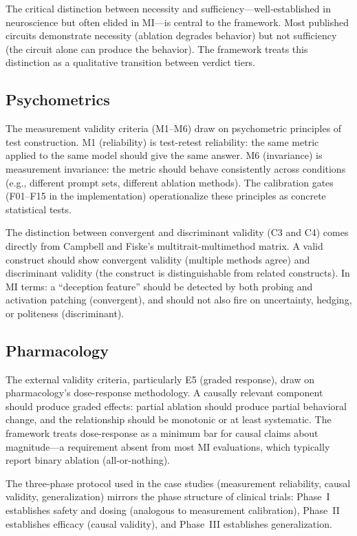 \documentclass[10pt]{article}
\newcommand{\eg}{e.g.}
\begin{document}
The critical distinction between necessity and sufficiency---well-established in neuroscience but often elided in MI---is central to the framework. Most published circuits demonstrate necessity (ablation degrades behavior) but not sufficiency (the circuit alone can produce the behavior). The framework treats this distinction as a qualitative transition between verdict tiers.

\subsection{Psychometrics}
\label{sec:psychometrics}

The measurement validity criteria (M1--M6) draw on psychometric principles of test construction. M1 (reliability) is test-retest reliability: the same metric applied to the same model should give the same answer. M6 (invariance) is measurement invariance: the metric should behave consistently across conditions (\eg, different prompt sets, different ablation methods). The calibration gates (F01--F15 in the implementation) operationalize these principles as concrete statistical tests.

The distinction between convergent and discriminant validity (C3 and C4) comes directly from Campbell and Fiske's multitrait-multimethod matrix. A valid construct should show convergent validity (multiple methods agree) and discriminant validity (the construct is distinguishable from related constructs). In MI terms: a ``deception feature'' should be detected by both probing and activation patching (convergent), and should not also fire on uncertainty, hedging, or politeness (discriminant).

\subsection{Pharmacology}
\label{sec:pharma}

The external validity criteria, particularly E5 (graded response), draw on pharmacology's dose-response methodology. A causally relevant component should produce graded effects: partial ablation should produce partial behavioral change, and the relationship should be monotonic or at least systematic. The framework treats dose-response as a minimum bar for causal claims about magnitude---a requirement absent from most MI evaluations, which typically report binary ablation (all-or-nothing).

The three-phase protocol used in the case studies (measurement reliability, causal validity, generalization) mirrors the phase structure of clinical trials: Phase~I establishes safety and dosing (analogous to measurement calibration), Phase~II establishes efficacy (causal validity), and Phase~III establishes generalization.
\end{document}
